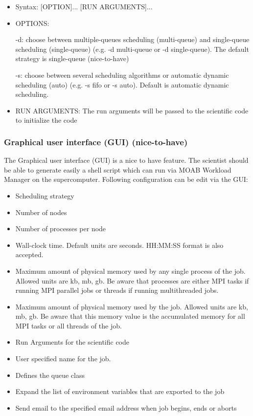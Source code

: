 		\begin{itemize}	
			\item Syntax: [OPTION]... [RUN ARGUMENTS]...
				
			\item OPTIONS:
							
				\subitem -d: choose between multiple-queues scheduling (multi-queue) and single-queue scheduling (single-queue) (e.g. -d multi-queue or -d single-queue). The default strategy is single-queue (nice-to-have)
				
				\subitem -s: choose between several scheduling algorithms or automatic dynamic scheduling (auto) (e.g. -s fifo or -s auto). Default is automatic dynamic scheduling.
					
			\item RUN ARGUMENTS:
				\subitem The run arguments will be passed to the scientific code to initialize the code
		\end{itemize}
		
	\subsubsection{Graphical user interface (GUI) (nice-to-have)}
		The Graphical user interface (GUI) is a nice to have feature. The scientist should be able to generate easily a shell script which can run via MOAB Workload Manager on the supercomputer. Following configuration can be edit via the GUI:
		
		\begin{itemize}
			\item Scheduling strategy
			\item Number of nodes
			\item Number of processes per node
			\item Wall-clock time. Default units are seconds. 
			HH:MM:SS format is also accepted.
			\item Maximum amount of physical memory used by any single process of the job. Allowed units are kb, mb, gb. Be aware that processes are either MPI tasks if running MPI parallel jobs or threads if running multithreaded jobs.
			\item Maximum amount of physical memory used by the job.
			Allowed units are kb, mb, gb. Be aware that this memory value is the accumulated memory for all MPI tasks or all threads of the job.
			\item Run Arguments for the scientific code
			\item User specified name for the job.
			\item Defines the queue class
			\item Expand the list of environment variables that are exported to the job
			\item Send email to the specified email address when job begins, ends or aborts
		\end{itemize}
	
	